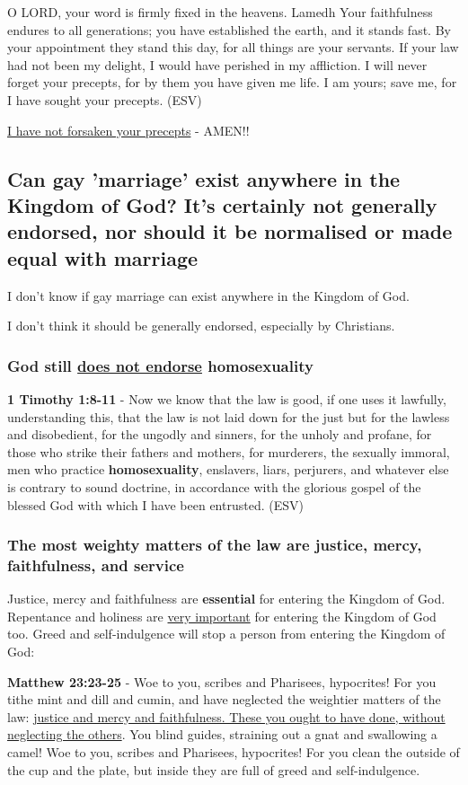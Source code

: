 \documentclass[11pt]{article}
\begin{document}
O LORD, your word is firmly fixed in the heavens. Lamedh Your faithfulness endures to all generations; you have established the earth, and it stands fast. By your appointment they stand this day, for all things are your servants. If your law had not been my delight, I would have perished in my affliction. I will never forget your precepts, for by them you have given me life. I am yours; save me, for I have sought your precepts. (ESV)

\uline{I have not forsaken your precepts} - AMEN!!

\subsection{Can gay 'marriage' exist anywhere in the Kingdom of God? It's certainly not generally endorsed, nor should it be normalised or made equal with marriage}
\label{sec:org5d82631}
I don't know if gay marriage can exist anywhere in the Kingdom of God.

I don't think it should be generally endorsed, especially by Christians.

\subsubsection{God still \underline{does not endorse} homosexuality}
\label{sec:org1df2fa4}
\textbf{1 Timothy 1:8-11} - Now we know that the law is good, if one uses it lawfully, understanding this, that the law is not laid down for the just but for the lawless and disobedient, for the ungodly and sinners, for the unholy and profane, for those who strike their fathers and mothers, for murderers, the sexually immoral, men who practice \textbf{homosexuality}, enslavers, liars, perjurers, and whatever else is contrary to sound doctrine, in accordance with the glorious gospel of the blessed God with which I have been entrusted. (ESV)

\subsubsection{The most weighty matters of the law are justice, mercy, faithfulness, and service}
\label{sec:org0575afe}
Justice, mercy and faithfulness are \textbf{essential} for entering the Kingdom of God. Repentance and holiness are \uline{very important} for entering the Kingdom of God too. Greed and self-indulgence will stop a person from entering the Kingdom of God:

\textbf{Matthew 23:23-25} - Woe to you, scribes and Pharisees, hypocrites! For you tithe mint and dill and cumin, and have neglected the weightier matters of the law: \uline{justice and mercy and faithfulness. These you ought to have done, without neglecting the others}.  You blind guides, straining out a gnat and swallowing a camel!  Woe to you, scribes and Pharisees, hypocrites! For you clean the outside of the cup and the plate, but inside they are full of greed and self-indulgence.
\end{document}
